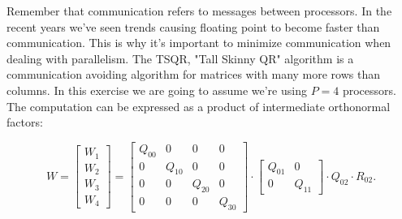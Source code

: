 \documentclass[11pt]{article}
\begin{document}
Remember that communication refers to messages between processors. In the recent years we've seen trends causing floating point to become faster than communication. This is why it's important to minimize communication when dealing with parallelism. The TSQR, "Tall Skinny QR" algorithm is a communication avoiding algorithm for matrices with many more rows than columns. In this exercise we are going to assume we're using $P=4$ processors. The computation can be expressed as a product of intermediate orthonormal factors:

\[ W = \begin{bmatrix} W_1 \\ W_2 \\ W_3 \\ W_4 \end{bmatrix} = \begin{bmatrix} Q_{00} & 0 & 0 & 0 \\ 0 & Q_{10} & 0 & 0 \\ 0 & 0 & Q_{20} & 0 \\ 0 & 0 & 0 & Q_{30} \end{bmatrix} \cdot \begin{bmatrix} Q_{01} & 0 \\ 0 & Q_{11} \end{bmatrix} \cdot Q_{02} \cdot R_{02}. \]
\end{document}
